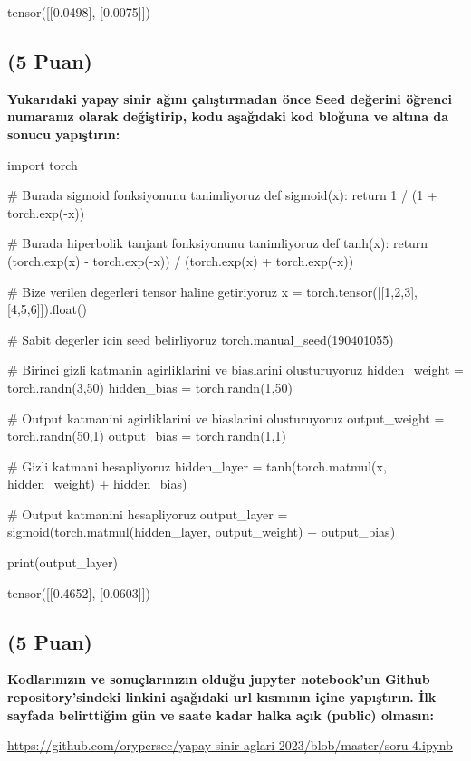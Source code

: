 \documentclass[11pt]{article}
\begin{document}
tensor([[0.0498],
        [0.0075]])

\subsection{(5 Puan)} \textbf{Yukarıdaki yapay sinir ağını çalıştırmadan önce Seed değerini öğrenci numaranız olarak değiştirip, kodu aşağıdaki kod bloğuna ve altına da sonucu yapıştırın:}

\begin{python}
import torch

# Burada sigmoid fonksiyonunu tanimliyoruz
def sigmoid(x):
    return 1 / (1 + torch.exp(-x))

# Burada hiperbolik tanjant fonksiyonunu tanimliyoruz
def tanh(x):
    return (torch.exp(x) - torch.exp(-x)) / (torch.exp(x) + torch.exp(-x))    

# Bize verilen degerleri tensor haline getiriyoruz
x = torch.tensor([[1,2,3],[4,5,6]]).float()

# Sabit degerler icin seed belirliyoruz
torch.manual_seed(190401055)

# Birinci gizli katmanin agirliklarini ve biaslarini olusturuyoruz
hidden_weight = torch.randn(3,50)
hidden_bias = torch.randn(1,50)

# Output katmanini agirliklarini ve biaslarini olusturuyoruz
output_weight = torch.randn(50,1)
output_bias = torch.randn(1,1)

# Gizli katmani hesapliyoruz
hidden_layer = tanh(torch.matmul(x, hidden_weight) + hidden_bias)

# Output katmanini hesapliyoruz
output_layer = sigmoid(torch.matmul(hidden_layer, output_weight) + output_bias)

print(output_layer)
\end{python}

tensor([[0.4652],
        [0.0603]])

\subsection{(5 Puan)} \textbf{Kodlarınızın ve sonuçlarınızın olduğu jupyter notebook'un Github repository'sindeki linkini aşağıdaki url kısmının içine yapıştırın. İlk sayfada belirttiğim gün ve saate kadar halka açık (public) olmasın:}

\url{https://github.com/orypersec/yapay-sinir-aglari-2023/blob/master/soru-4.ipynb}
\end{document}

